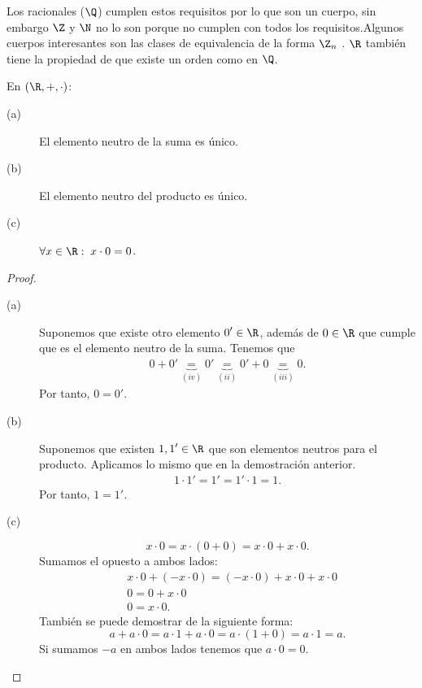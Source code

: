 Los racionales ($\displaystyle  \Q $) cumplen estos requisitos por lo que son un cuerpo, sin embargo $\displaystyle \Z $ y $\displaystyle \N $ no lo son porque no cumplen con todos los requisitos.Algunos cuerpos interesantes son las clases de equivalencia de la forma $\displaystyle \Z_{n} $ . $\displaystyle \R $ también tiene la propiedad de que existe un orden como en $\displaystyle \Q $. 

\begin{ftheorem}[]
\normalfont En $\displaystyle \left(\R, +, \cdot\right) $:
\begin{description}
\item[(a)] El elemento neutro de la suma es único. 
\item[(b)] El elemento neutro del producto es único. 
\item[(c)] $\displaystyle \forall x \in \R: \; x \cdot 0 = 0 $. 
\end{description}
\end{ftheorem}

\begin{proof}
\begin{description}
\item[(a)] Suponemos que existe otro elemento $\displaystyle 0'\in\R $, además de $\displaystyle 0 \in \R $  que cumple que es el elemento neutro de la suma. Tenemos que 
	\[
	\begin{split}
		0 + 0' \underbrace{=}_{\left(iv\right)} 0' \underbrace{=}_{\left(ii\right)}  0' + 0 \underbrace{=}_{\left(iii\right)} 0.
	\end{split}
	\]
Por tanto, $\displaystyle 0 = 0' $. 
\item[(b)] Suponemos que existen $\displaystyle 1, 1' \in \R $ que son elementos neutros para el producto. Aplicamos lo mismo que en la demostración anterior. 
	\[
	\begin{split}
	1 \cdot 1' = 1' = 1' \cdot 1 = 1 .
	\end{split}
	\]
Por tanto, $\displaystyle 1 = 1' $. 
\item[(c)] 
\[x \cdot 0 = x \cdot \left(0 + 0\right) = x \cdot 0 + x \cdot 0.\]
Sumamos el opuesto a ambos lados:
\[
\begin{split}
& x \cdot 0 + \left(-x \cdot 0\right) = \left(- x \cdot 0\right) + x \cdot 0 + x \cdot 0 \\
& 0 = 0 + x \cdot 0 \\
& 0 = x \cdot 0.
\end{split}
\]
También se puede demostrar de la siguiente forma:
\[a + a \cdot 0 = a \cdot 1 + a \cdot 0 = a \cdot\left(1 + 0\right) = a \cdot 1 = a .\]
Si sumamos $\displaystyle -a $ en ambos lados tenemos que $\displaystyle a \cdot 0 = 0 $.
\end{description}
\end{proof}

